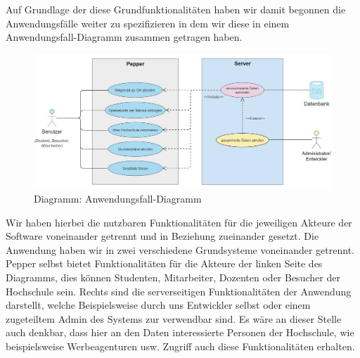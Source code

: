 

Auf Grundlage der diese Grundfunktionalitäten haben wir damit begonnen die Anwendungsfälle weiter zu spezifizieren in dem wir diese in einem Anwendungsfall-Diagramm zusammen getragen haben. \\

\begin{figure}[H]
    \includegraphics[width=\textwidth]{Figures/use-case-diagram.jpg}
    \caption{Diagramm: Anwendungsfall-Diagramm}
    \label{fig:integration}
    \centering
\end{figure}

Wir haben hierbei die nutzbaren Funktionalitäten für die jeweiligen Akteure der Software voneinander getrennt und in Beziehung zueinander gesetzt. Die Anwendung haben wir in zwei verschiedene Grundsysteme voneinander getrennt. Pepper selbst bietet Funktionalitäten für die Akteure der linken Seite des Diagramms, dies können Studenten, Mitarbeiter, Dozenten oder Besucher der Hochschule sein. Rechts sind die serverseitigen Funktionalitäten der Anwendung darstellt, welche Beispielsweise durch uns Entwickler selbst oder einem zugeteiltem Admin des Systems zur verwendbar sind. Es wäre an dieser Stelle auch denkbar, dass hier an den Daten interessierte Personen der Hochschule, wie beispielsweise Werbeagenturen usw. Zugriff auch diese Funktionalitäten erhalten.

